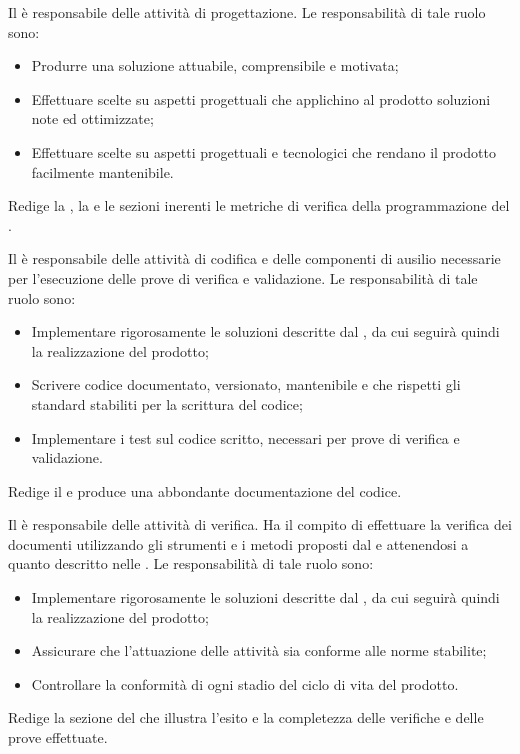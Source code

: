 \documentclass[12pt,a4paper]{article}
\begin{document}
Il \PG{} è responsabile delle attività di progettazione. Le responsabilità di tale
ruolo sono:
\begin{itemize}
	\item Produrre una soluzione attuabile, comprensibile e motivata;
	\item Effettuare scelte su aspetti progettuali che applichino al prodotto soluzioni note ed ottimizzate;
	\item Effettuare scelte su aspetti progettuali e tecnologici che rendano il prodotto facilmente mantenibile.
\end{itemize}
Redige la \ST, la \DP e le sezioni inerenti le metriche di verifica della programmazione del \PdQ{}.

Il \PR{} è responsabile delle attività di codifica e delle componenti di ausilio necessarie per l'esecuzione delle prove di verifica e validazione. Le responsabilità di tale ruolo sono:
\begin{itemize}
	\item Implementare rigorosamente le soluzioni descritte dal \PG{}, da cui seguirà quindi la realizzazione del prodotto;
	\item Scrivere codice documentato, versionato, mantenibile e che rispetti gli standard stabiliti per la scrittura del codice;
	\item Implementare i test sul codice scritto, necessari per prove di verifica e validazione.
\end{itemize}
Redige il \MU e produce una abbondante documentazione del codice.

Il \VR{} è responsabile delle attività di verifica. Ha il compito di effettuare la verifica dei documenti utilizzando gli strumenti e i metodi proposti dal \PdQ{} e attenendosi a quanto descritto nelle \NdP{}. 
Le responsabilità di tale ruolo sono:
\begin{itemize}
	\item Implementare rigorosamente le soluzioni descritte dal \PG{}, da cui seguirà quindi la realizzazione del prodotto;
	\item Assicurare che l'attuazione delle attività sia conforme alle norme stabilite;
	\item Controllare la conformità di ogni stadio del ciclo di vita del prodotto.
\end{itemize}
Redige la sezione del \PdQ{} che illustra l'esito e la completezza delle verifiche
e delle prove effettuate.
\end{document}
